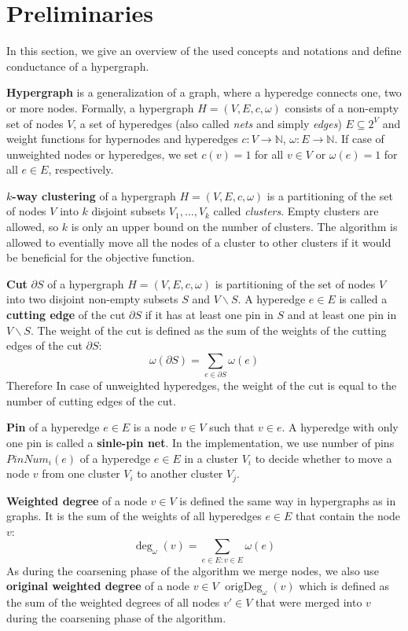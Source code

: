 \documentclass[acmsmall,nonacm,screen,review]{acmart}
\DeclareMathOperator{\origDeg}{origDeg}
\begin{document}
\section{Preliminaries}
\label{sec:preliminaries}

In this section, we give an overview of the used concepts and notations and 
define conductance of a hypergraph.

\textbf{Hypergraph} is a generalization of a graph, where a hyperedge connects 
one, two or more nodes. Formally, a hypergraph $H = (V, E, c, \omega)$ consists 
of a non-empty set of nodes $V$, a set of hyperedges (also called \textit{nets}
and simply \textit{edges}) $E \subseteq 2^V$ and weight functions for hypernodes 
and hyperedges $c: V \to \mathbb{N}$, $\omega: E \to \mathbb{N}$. If case of 
unweighted nodes or hyperedges, we set $c(v) = 1$ for all $v \in V$ or 
$\omega(e) = 1$ for all $e \in E$, respectively. 

\textbf{$k$-way clustering} of a hypergraph $H = (V, E, c, \omega)$ is a
partitioning of the set of nodes $V$ into $k$ disjoint subsets 
$V_1, \dots, V_k$ called \textit{clusters}. Empty clusters are allowed, so
$k$ is only an upper bound on the number of clusters. The algorithm is allowed 
to eventially move all the nodes of a cluster to other clusters if it would be
beneficial for the objective function. 

\textbf{Cut} $\partial S$ of a hypergraph $H = (V, E, c, \omega)$ is partitioning
of the set of nodes $V$ into two disjoint non-empty subsets $S$ and 
$V \backslash S$. A hyperedge $e \in E$ is called a \textbf{cutting edge} of 
the cut $\partial S$ if it has at least one pin in $S$ and at least one pin in
$V \backslash S$. The weight of the cut is defined as the sum of the weights of
the cutting edges of the cut $\partial S$: 
\[\omega(\partial S) = \sum_{e \in \partial S} \omega(e)\]
Therefore In case of unweighted hyperedges, the weight of the cut is equal to 
the number of cutting edges of the cut.

\textbf{Pin} of a hyperedge $e \in E$ is a node $v \in V$ such that $v \in e$.
A hyperedge with only one pin is called a \textbf{sinle-pin net}.
In the implementation, we use number of pins $PinNum_i(e)$ of a hyperedge 
$e \in E$ in a cluster $V_i$ to decide whether to move a node $v$ from one
cluster $V_i$ to another cluster $V_j$.

\textbf{Weighted degree} of a node $v \in V$ is defined the same way in 
hypergraphs as in graphs. It is the sum of the weights of all hyperedges 
$e \in E$ that contain the node $v$: 
\[\deg_\omega(v) = \sum_{e\in E: v \in E} \omega(e)\]
As during the coarsening phase of the algorithm we merge nodes, we also use
\textbf{original weighted degree} of a node $v \in V$  $\origDeg_\omega(v)$ 
which is defined as the sum of the weighted degrees of all nodes $v' \in V$ 
that were merged into $v$ during the coarsening phase of the algorithm.
\end{document}
